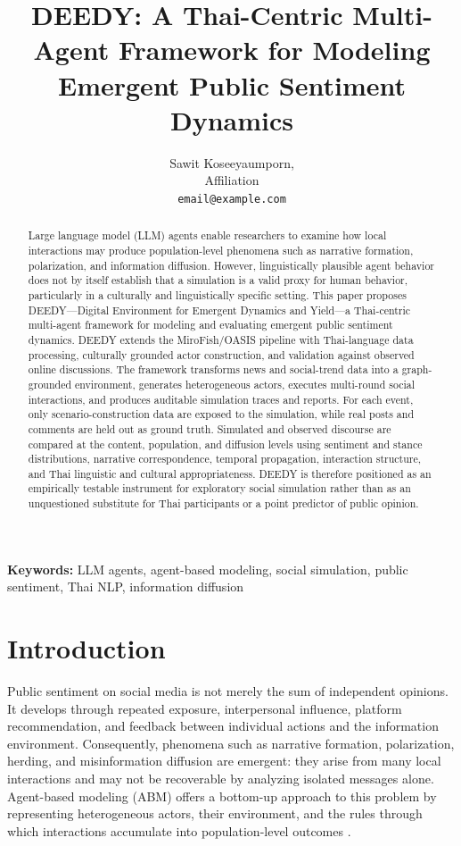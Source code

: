 \documentclass[10pt,twocolumn]{article}
\title{\textbf{DEEDY: A Thai-Centric Multi-Agent Framework for Modeling\\
Emergent Public Sentiment Dynamics}}
\author{Sawit Koseeyaumporn, \\
\small Affiliation\\
\small \texttt{email@example.com}}
\date{}
\begin{document}
\maketitle

\begin{abstract}
Large language model (LLM) agents enable researchers to examine how local
interactions may produce population-level phenomena such as narrative
formation, polarization, and information diffusion. However, linguistically
plausible agent behavior does not by itself establish that a simulation is a
valid proxy for human behavior, particularly in a culturally and
linguistically specific setting. This paper proposes DEEDY---Digital
Environment for Emergent Dynamics and Yield---a Thai-centric multi-agent
framework for modeling and evaluating emergent public sentiment dynamics.
DEEDY extends the MiroFish/OASIS pipeline with Thai-language data processing,
culturally grounded actor construction, and validation against observed online
discussions. The framework transforms news and social-trend data into a
graph-grounded environment, generates heterogeneous actors, executes
multi-round social interactions, and produces auditable simulation traces and
reports. For each event, only scenario-construction data are exposed to the
simulation, while real posts and comments are held out as ground truth.
Simulated and observed discourse are compared at the content, population, and
diffusion levels using sentiment and stance distributions, narrative
correspondence, temporal propagation, interaction structure, and Thai
linguistic and cultural appropriateness. DEEDY is therefore positioned as an
empirically testable instrument for exploratory social simulation rather than
as an unquestioned substitute for Thai participants or a point predictor of
public opinion.
\end{abstract}

\noindent\textbf{Keywords:} LLM agents, agent-based modeling, social
simulation, public sentiment, Thai NLP, information diffusion

\section{Introduction}
\label{sec:introduction}

Public sentiment on social media is not merely the sum of independent
opinions. It develops through repeated exposure, interpersonal influence,
platform recommendation, and feedback between individual actions and the
information environment. Consequently, phenomena such as narrative formation,
polarization, herding, and misinformation diffusion are emergent: they arise
from many local interactions and may not be recoverable by analyzing isolated
messages alone. Agent-based modeling (ABM) offers a bottom-up approach to this
problem by representing heterogeneous actors, their environment, and the rules
through which interactions accumulate into population-level outcomes
\citep{macal2010tutorial,gao2024survey}.
\end{document}
